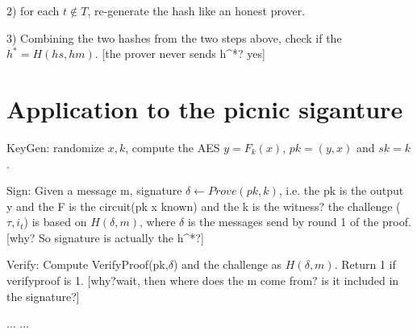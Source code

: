 \documentclass{report}
\begin{document}
2) for each $t \notin T$, re-generate the hash like an honest prover. 

3) Combining the two hashes from the two steps above, check if the $h^* = H(hs,hm)$. [the prover never sends h^*? yes]



\section{Application to the picnic siganture}


KeyGen: randomize $x, k$, compute the AES $y = F_k(x)$, $pk = (y,x)$ and $sk = k$.

Sign: Given a message m, signature $\delta \leftarrow Prove(pk,k)$, i.e. the pk is the output y and the F is the circuit(pk x known) and the k is the witness? the challenge ($\tau, i_t$) is based on $H(\delta, m)$, where $\delta$ is the messages send by round 1 of the proof. [why? So signature is actually the h^*?]

Verify: Compute VerifyProof(pk,$\delta$) and the challenge as $H(\delta, m)$. Return 1 if verifyproof is 1. [why?wait, then where does the m come from? is it included in the signature?]



\begin{thebibliography}{99}
 ...
 ...
\end{thebibliography}

\printindex
\end{document}
